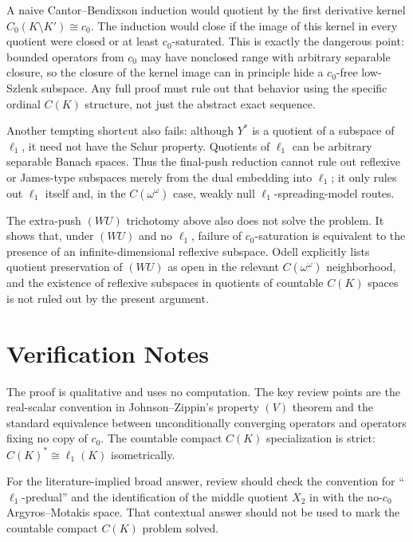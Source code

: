 \documentclass[11pt]{article}
\begin{document}
A naive Cantor--Bendixson induction would quotient by the first derivative kernel \(C_0(K\setminus K')\cong c_0\).  The induction would close if the image of this kernel in every quotient were closed or at least \(c_0\)-saturated.  This is exactly the dangerous point: bounded operators from \(c_0\) may have nonclosed range with arbitrary separable closure, so the closure of the kernel image can in principle hide a \(c_0\)-free low-Szlenk subspace.  Any full proof must rule out that behavior using the specific ordinal \(C(K)\) structure, not just the abstract exact sequence.

Another tempting shortcut also fails: although \(Y^*\) is a quotient of a subspace of \(\ell_1\), it need not have the Schur property.  Quotients of \(\ell_1\) can be arbitrary separable Banach spaces.  Thus the final-push reduction cannot rule out reflexive or James-type subspaces merely from the dual embedding into \(\ell_1\); it only rules out \(\ell_1\) itself and, in the \(C(\omega^\omega)\) case, weakly null \(\ell_1\)-spreading-model routes.

The extra-push \((WU)\) trichotomy above also does not solve the problem.  It shows that, under \((WU)\) and no \(\ell_1\), failure of \(c_0\)-saturation is equivalent to the presence of an infinite-dimensional reflexive subspace.  Odell explicitly lists quotient preservation of \((WU)\) as open in the relevant \(C(\omega^\omega)\) neighborhood, and the existence of reflexive subspaces in quotients of countable \(C(K)\) spaces is not ruled out by the present argument.

\section*{Verification Notes}

The proof is qualitative and uses no computation.  The key review points are the real-scalar convention in Johnson--Zippin's property \((V)\) theorem and the standard equivalence between unconditionally converging operators and operators fixing no copy of \(c_0\).  The countable compact \(C(K)\) specialization is strict: \(C(K)^*\cong \ell_1(K)\) isometrically.

For the literature-implied broad answer, review should check the convention for ``\(\ell_1\)-predual'' and the identification of the middle quotient \(X_2\) in \cite{AM} with the no-\(c_0\) Argyros--Motakis space.  That contextual answer should not be used to mark the countable compact \(C(K)\) problem solved.
\end{document}
